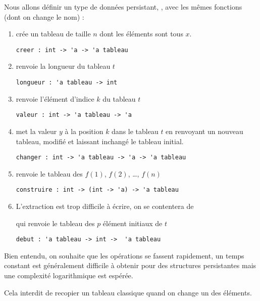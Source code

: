 \newpage

Nous allons définir un type de données persistant, , avec les mêmes fonctions (dont on change le nom) : 
\begin{enumerate}
\item {} crée un tableau de taille $n$ dont les éléments sont tous $x$.
\begin{lstlisting}
creer : int -> 'a -> 'a tableau
\end{lstlisting}

\item {} renvoie la longueur du tableau $t$
\begin{lstlisting}
longueur : 'a tableau -> int
\end{lstlisting}

\item {} renvoie l'élément d'indice $k$ du tableau $t$
\begin{lstlisting}
valeur : int -> 'a tableau -> 'a
\end{lstlisting}

\item {} met la valeur $y$ à la position $k$ dans le tableau $t$ en renvoyant un nouveau tableau, modifié et laissant inchangé le tableau initial.
\begin{lstlisting}
changer : int -> 'a tableau -> 'a -> 'a tableau
\end{lstlisting}

\item {} renvoie le tableau des $f(1)$, $f(2)$, \ldots, $f(n)$
\begin{lstlisting}
construire : int -> (int -> 'a) -> 'a tableau
\end{lstlisting}

\item L'extraction est trop difficile à écrire, on se contentera de

 qui renvoie le tableau des $p$ élément initiaux de $t$
\begin{lstlisting}
debut : 'a tableau -> int ->  'a tableau
\end{lstlisting}
\end{enumerate}

Bien entendu, on souhaite que les opérations se fassent rapidement, un temps constant est généralement difficile à obtenir pour des structures persistantes mais une complexité logarithmique est espérée.

Cela interdit de recopier un tableau classique quand on change un des éléments.
